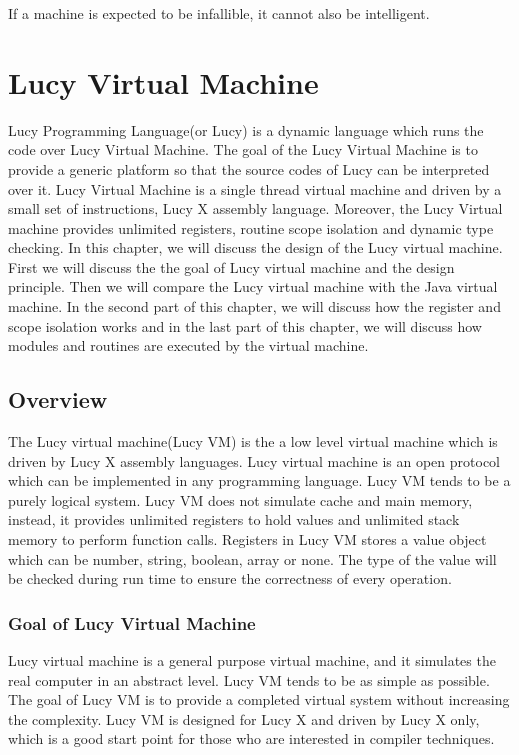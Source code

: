 \begin{savequote}[75mm]
If a machine is expected to be infallible, it cannot also be intelligent.
\end{savequote}

\chapter{Lucy Virtual Machine}
Lucy Programming Language(or Lucy) is a dynamic language which runs the code over Lucy Virtual Machine. The goal of the Lucy Virtual Machine is to provide a generic platform so that the source codes of Lucy can be interpreted over it. Lucy Virtual Machine is a single thread virtual machine and driven by a small set of instructions, Lucy X assembly language. Moreover, the Lucy Virtual machine provides unlimited registers, routine scope isolation and dynamic type checking. In this chapter, we will discuss the design of the Lucy virtual machine. First we will discuss the the goal of Lucy virtual machine and the design principle. Then we will compare the Lucy virtual machine with the Java virtual machine. In the second part of this chapter, we will discuss how the register and scope isolation works and in the last part of this chapter, we will discuss how modules and routines are executed by the virtual machine.

\section{Overview}
The Lucy virtual machine(Lucy VM) is the a low level virtual machine which is driven by Lucy X assembly languages. Lucy virtual machine is an open protocol which can be implemented in any programming language. Lucy VM tends to be a purely logical system. Lucy VM does not simulate cache and main memory, instead, it provides unlimited registers to hold values and unlimited stack memory to perform function calls. Registers in Lucy VM stores a value object which can be number, string, boolean, array or none. The type of the value will be checked during run time to ensure the correctness of every operation.

\subsection{Goal of Lucy Virtual Machine}
Lucy virtual machine is a general purpose virtual machine, and it simulates the real computer in an abstract level. Lucy VM tends to be as simple as possible. The goal of Lucy VM is to provide a completed virtual system without increasing the complexity. Lucy VM is designed for Lucy X and driven by Lucy X only, which is a good start point for those who are interested in compiler techniques.

